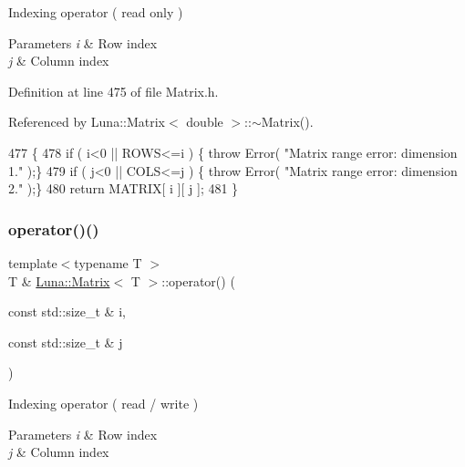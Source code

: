 Indexing operator ( read only ) 


\begin{DoxyParams}{Parameters}
{\em i} & Row index \\
\hline
{\em j} & Column index \\
\hline
\end{DoxyParams}


Definition at line 475 of file Matrix.\+h.



Referenced by Luna\+::\+Matrix$<$ double $>$\+::$\sim$\+Matrix().


\begin{DoxyCode}
477   \{
478     \textcolor{keywordflow}{if} ( i<0 || ROWS<=i )   \{ \textcolor{keywordflow}{throw} Error( \textcolor{stringliteral}{"Matrix range error: dimension 1."} );\}
479     \textcolor{keywordflow}{if} ( j<0 || COLS<=j )   \{ \textcolor{keywordflow}{throw} Error( \textcolor{stringliteral}{"Matrix range error: dimension 2."} );\}
480     \textcolor{keywordflow}{return} MATRIX[ i ][ j ];
481   \}
\end{DoxyCode}
\mbox{\label{classLuna_1_1Matrix_a8b3b21c2f3a16c313e6fcd2ca1def654}} 
\subsubsection{\texorpdfstring{operator()()}{operator()()}\hspace{0.1cm}{\footnotesize\ttfamily [2/2]}}
{\footnotesize\ttfamily template$<$typename T $>$ \\
T \& \hyperlink{classLuna_1_1Matrix}{Luna\+::\+Matrix}$<$ T $>$\+::operator() (\begin{DoxyParamCaption}\item[{const std\+::size\+\_\+t \&}]{i,  }\item[{const std\+::size\+\_\+t \&}]{j }\end{DoxyParamCaption})\hspace{0.3cm}{\ttfamily [inline]}}



Indexing operator ( read / write ) 


\begin{DoxyParams}{Parameters}
{\em i} & Row index \\
\hline
{\em j} & Column index \\
\hline
\end{DoxyParams}


